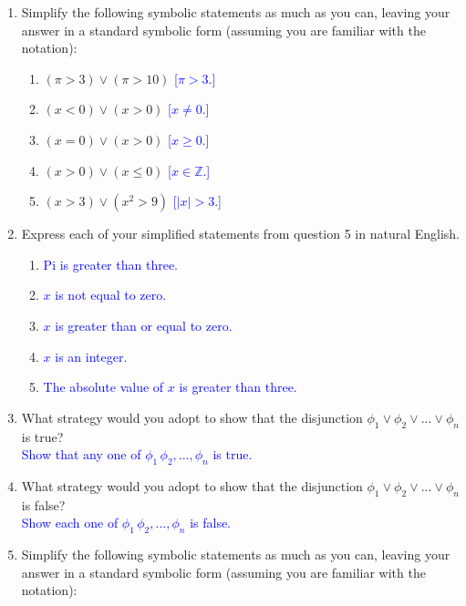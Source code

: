 \documentclass[13.5pt]{article}
\begin{document}
\begin{enumerate}
\item{Simplify the following symbolic statements as much as you can, leaving your answer in a standard symbolic form (assuming you are familiar with the notation):}

\begin{enumerate} 
  \item{\((\pi>3)\vee(\pi>10)\)}    \textcolor{blue}{[\(\pi>3\).]}
  \item{\((x<0)\vee(x>0)\)}   \textcolor{blue}{[\(x\neq0\).]}
  \item{\((x=0)\vee(x>0)\)}   \textcolor{blue}{[\(x\geq0\).]} 
  \item{\((x>0)\vee(x\leq0)\)}   \textcolor{blue}{[\(x\in \mathbb{Z}\).]} 
  \item{\((x>3)\vee(x^2>9)\)}   \textcolor{blue}{[\(|x|>3\).]} 
\end{enumerate}

\item{Express each of your simplified statements from question 5 in natural English.}

\begin{enumerate}
\item \textcolor{blue}{Pi is greater than three.}
\item \textcolor{blue}{\(x\) is not equal to zero.}
\item \textcolor{blue}{\(x\) is greater than or equal to zero.}
\item \textcolor{blue}{\(x\) is an integer.}
\item \textcolor{blue}{The absolute value of \(x\) is greater than three.}
\end{enumerate}

\item{What strategy would you adopt to show that the disjunction \(\phi_1\vee\phi_2\vee...\vee \phi_n\) is true? }\\
\textcolor{blue}{Show that any one of \(\phi_1\,\phi_2,...,\phi_n\) is true.}

\item{What strategy would you adopt to show that the disjunction \(\phi_1\vee\phi_2\vee...\vee \phi_n\) is false? }\\
\textcolor{blue}{Show each one of \(\phi_1\,\phi_2,...,\phi_n\) is false.}

\item{ Simplify the following symbolic statements as much as you can, leaving your answer in a standard symbolic form (assuming you are familiar with the notation):}


\end{enumerate}
\end{document}
